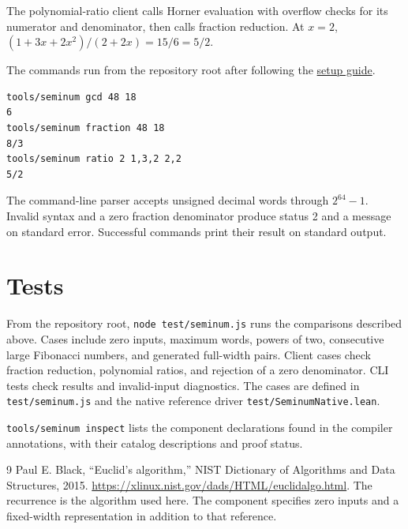 The polynomial-ratio client calls Horner evaluation with overflow checks for its
numerator and denominator, then calls fraction reduction.  At $x=2$,
$(1+3x+2x^2)/(2+2x)=15/6=5/2$.

The commands run from the repository root after following the
\href{https://github.com/jsmorph/leanexe/blob/lib1/DEVELOPING.md}{setup guide}.

\begin{lstlisting}
tools/seminum gcd 48 18
6
tools/seminum fraction 48 18
8/3
tools/seminum ratio 2 1,3,2 2,2
5/2
\end{lstlisting}

The command-line parser accepts unsigned decimal words through $2^{64}-1$.
Invalid syntax and a zero fraction denominator produce status 2 and a message
on standard error.  Successful commands print their result on standard output.

\section{Tests}
From the repository root, \texttt{node test/seminum.js} runs the comparisons
described above.  Cases include zero inputs, maximum words, powers of two,
consecutive large Fibonacci numbers, and generated full-width pairs.
Client cases check fraction reduction, polynomial ratios, and rejection of
a zero denominator.  CLI tests check results and invalid-input diagnostics.
The cases are defined in \texttt{test/seminum.js} and the native reference
driver \texttt{test/SeminumNative.lean}.

\texttt{tools/seminum inspect} lists the component declarations found in the
compiler annotations, with their catalog descriptions and proof status.

\begin{thebibliography}{9}
 Paul E. Black, ``Euclid's algorithm,'' NIST Dictionary of
Algorithms and Data Structures, 2015.
\url{https://xlinux.nist.gov/dads/HTML/euclidalgo.html}.
The recurrence is the algorithm used here.  The component specifies zero inputs
and a fixed-width representation in addition to that reference.
\end{thebibliography}

